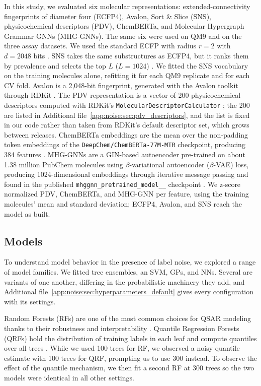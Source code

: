In this study, we evaluated six molecular representations: extended-connectivity fingerprints of diameter four (ECFP4), Avalon, Sort \& Slice (SNS), physicochemical descriptors (PDV), ChemBERTa, and Molecular Hypergraph Grammar GNNs (MHG-GNNs). The same six were used on QM9 and on the three assay datasets. We used the standard ECFP with radius $r = 2$ with $d = 2048$ bits \citep{rogers2010, rdkit}. SNS takes the same substructures as ECFP4, but it ranks them by prevalence and selects the top $L$ ($L=1024$) \citep{sns}. We fitted the SNS vocabulary on the training molecules alone, refitting it for each QM9 replicate and for each CV fold. Avalon is a 2,048-bit fingerprint, generated with the Avalon toolkit through RDKit \citep{Gedeck2006, rdkit}. The PDV representation is a vector of 200 physicochemical descriptors computed with RDKit's \texttt{MolecularDescriptorCalculator} \citep{rdkit, Cherkasov2014}; the 200 are listed in Additional file~\ref{app:noise:sec:pdv_descriptors}, and the list is fixed in our code rather than taken from RDKit's default descriptor set, which grows between releases. ChemBERTa embeddings are the mean over the non-padding token embeddings of the \texttt{DeepChem/ChemBERTa-77M-MTR} checkpoint, producing 384 features \citep{Ahmad2022}. MHG-GNNs are a GIN-based autoencoder pre-trained on about 1.38 million PubChem molecules using $\beta$-variational autoencoder ($\beta$-VAE) loss, producing 1024-dimensional embeddings through iterative message passing and found in the published \texttt{mhggnn\_\allowbreak pretrained\_\allowbreak model\_\_} checkpoint \citep{kishimoto2023}. We z-score normalized PDV, ChemBERTa, and MHG-GNN per feature, using the training molecules' mean and standard deviation; ECFP4, Avalon, and SNS reach the model as built.

\subsection{Models}

To understand model behavior in the presence of label noise, we explored a range of model families. We fitted tree ensembles, an SVM, GPs, and NNs. Several are variants of one another, differing in the probabilistic machinery they add, and Additional file~\ref{app:noise:sec:hyperparameters_default} gives every configuration with its settings.

Random Forests (RFs) are one of the most common choices for QSAR modeling thanks to their robustness and interpretability \citep{Svetnik2003}. Quantile Regression Forests (QRFs) hold the distribution of training labels in each leaf and compute quantiles over all trees \citep{Meinshausen2006}. While we used 100 trees for RF, we observed a noisy quantile estimate with 100 trees for QRF, prompting us to use 300 instead. To observe the effect of the quantile mechanism, we then fit a second RF at 300 trees so the two models were identical in all other settings. 

